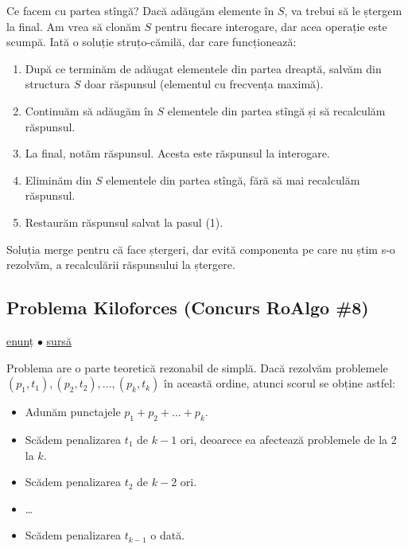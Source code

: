 Ce facem cu partea stîngă? Dacă adăugăm elemente în $S$, va trebui să le ștergem la final. Am vrea să clonăm $S$ pentru fiecare interogare, dar acea operație este scumpă. Iată o soluție struțo-cămilă, dar care funcționează:

\begin{enumerate}
  \item După ce terminăm de adăugat elementele din partea dreaptă, salvăm din structura $S$ doar răspunsul (elementul cu frecvența maximă).
  \item Continuăm să adăugăm în $S$ elementele din partea stîngă și să recalculăm răspunsul.
  \item La final, notăm răspunsul. Acesta este răspunsul la interogare.
  \item Eliminăm din $S$ elementele din partea stîngă, fără să mai recalculăm răspunsul.
  \item Restaurăm răspunsul salvat la pasul (1).
\end{enumerate}

Soluția merge pentru că face ștergeri, dar evită componenta pe care nu știm s-o rezolvăm, a recalculării răspunsului la ștergere.

\subsection{Problema Kiloforces (Concurs RoAlgo \#8)}
\label{problem:kiloforces}

\href{https://kilonova.ro/problems/2021}{enunț}
$\bullet$
\hyperref[code:kiloforces]{sursă}

Problema are o parte teoretică rezonabil de simplă. Dacă rezolvăm problemele $(p_1, t_1), (p_2, t_2), \dots, (p_k, t_k)$ în această ordine, atunci scorul se obține astfel:

\begin{itemize}
  \item Adunăm punctajele $p_1 + p_2 + \dots + p_k$.

  \item Scădem penalizarea $t_1$ de $k-1$ ori, deoarece ea afectează problemele de la 2 la $k$.

  \item Scădem penalizarea $t_2$ de $k-2$ ori.

  \item \dots

  \item Scădem penalizarea $t_{k-1}$ o dată.
\end{itemize}

